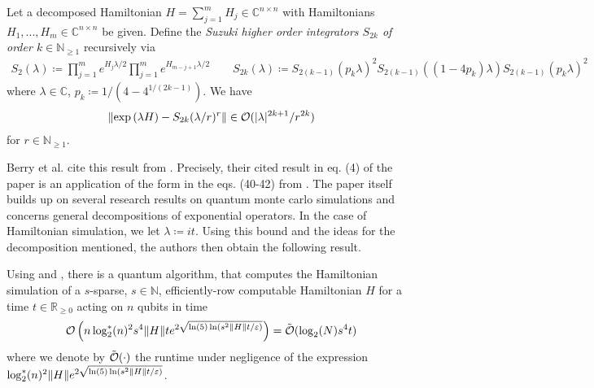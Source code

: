 \begin{theorem} \label{suzuki_integrators}
    Let a decomposed Hamiltonian \(H = \sum_{j=1}^m H_j \in \mathbb{C}^{n \times n}\) with Hamiltonians \(H_1, ..., H_m \in \mathbb{C}^{n \times n}\) be given. Define the \emph{Suzuki higher order integrators \(S_{2k}\) of order \(k \in \mathbb{N}_{\geq 1}\)} recursively via
    \begin{align}
        S_2(\lambda) \coloneqq \prod_{j=1}^m e^{H_j \lambda/2} \prod_{j=1}^m e^{H_{m-j+1} \lambda/2} \qquad S_{2k}(\lambda) \coloneqq S_{2(k-1)}(p_k\lambda)^2S_{2(k-1)}((1-4p_k)\lambda)S_{2(k-1)}(p_k\lambda)^2
    \end{align}
    where \(\lambda \in \mathbb{C}\), \(p_k \coloneqq 1/(4-4^{1/(2k-1)})\). We have
    \begin{align}
        \norm{\exp\left(\lambda H\right) - S_{2k}(\lambda/r)^r} \in \operatorname{\mathcal{O}}(|\lambda|^{2k+1}/r^{2k})
    \end{align}
    for \(r \in \mathbb{N}_{\geq 1}\).
\end{theorem}

Berry et al. \cite{Berry2005} cite this result from \cite{Suzuki_1990}. Precisely, their cited result in eq. (4) of the paper is an application of the form in the eqs. (40-42) from \cite[p. 4]{Suzuki_1990}. The paper itself builds up on several research results on quantum monte carlo simulations \cite[p. 1]{Suzuki_1990} and concerns general decompositions of exponential operators. In the case of Hamiltonian simulation, we let \(\lambda \coloneqq it\). Using this bound and the ideas for the decomposition mentioned, the authors then obtain the following result.

\begin{theorem} \label{sparse_hamiltonian_simulation}
    Using  and , there is a quantum algorithm, that computes the Hamiltonian simulation of a \(s\)-sparse, \(s \in \mathbb{N}\), efficiently-row computable Hamiltonian \(H\) for a time \(t \in \mathbb{R}_{\geq 0}\) acting on \(n\) qubits in time
    \begin{align}
        \operatorname{\mathcal{O}}\left(n\log_2^*(n)^2s^4\norm{H}te^{2\sqrt{\ln(5)\ln(s^2\norm{H}t/\varepsilon)}}\right) = \tilde{\operatorname{\mathcal{O}}}(\log_2(N) s^4 t)
    \end{align}
    where we denote by \(\tilde{\operatorname{\mathcal{O}}}(\cdot)\) the runtime under negligence of the expression \(\log_2^*(n)^2\norm{H}e^{2\sqrt{\ln(5)\ln(s^2\norm{H}t/\varepsilon)}}\).
\end{theorem}


